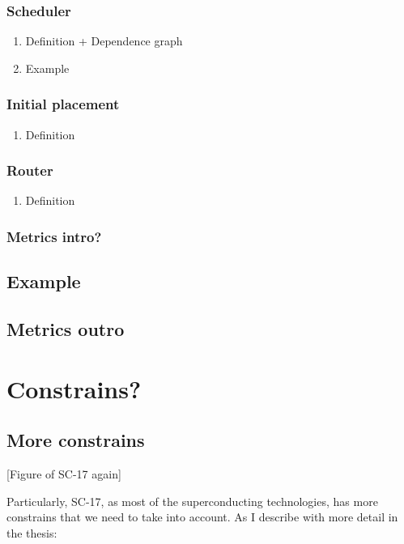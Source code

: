 \documentclass[11pt]{article}
\begin{document}
\subsubsection{Scheduler}
\label{sec:orge24e8c4}

\begin{enumerate}
\item Definition + Dependence graph
\label{sec:orge8c7094}

\item Example
\label{sec:org296ad38}
\end{enumerate}
\subsubsection{Initial placement}
\label{sec:orgfb46bf6}
\begin{enumerate}
\item Definition
\label{sec:orgbaa068c}
\end{enumerate}
\subsubsection{Router}
\label{sec:org60943ef}
\begin{enumerate}
\item Definition
\label{sec:org9c82baf}
\end{enumerate}
\subsubsection{Metrics intro?}
\label{sec:orgaf8f759}
\subsection{Example}
\label{sec:orgbba9723}
\subsection{Metrics outro}
\label{sec:org3136856}
\section{Constrains?}
\label{sec:org5bf8fbe}
\subsection{More constrains}
\label{sec:org1320c1c}

[Figure of SC-17 again]

Particularly, SC-17, as most of the superconducting technologies, has more constrains that we need to take into account.
As I describe with more detail in the thesis:
\end{document}
